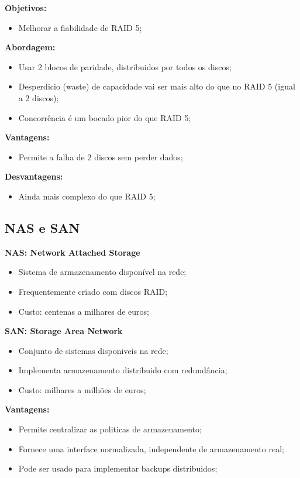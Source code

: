 \documentclass{article}
\begin{document}
\begin{flushleft}
  \textbf{Objetivos:}
  \begin{itemize}
    \item Melhorar a fiabilidade de RAID 5;
  \end{itemize}

  \textbf{Abordagem:}
  \begin{itemize}
    \item Usar 2 blocos de paridade, distribuidos por todos os discos;
    \item Desperdicio (waste) de capacidade vai ser mais alto do que no RAID 5 (igual a 2 discos);
    \item Concorrência é um bocado pior do que RAID 5;
  \end{itemize}

  \textbf{Vantagens:}
  \begin{itemize}
    \item Permite a falha de 2 discos sem perder dados;
  \end{itemize}

  \textbf{Desvantagens:}
  \begin{itemize}
    \item Ainda mais complexo do que RAID 5;
  \end{itemize}
\end{flushleft}

\subsection{NAS e SAN}

\begin{flushleft}
  \textbf{NAS: Network Attached Storage}
  \begin{itemize}
    \item Sistema de armazenamento disponível na rede;
    \item Frequentemente criado com discos RAID;
    \item Custo: centenas a milhares de euros;
  \end{itemize}

  \textbf{SAN: Storage Area Network}
  \begin{itemize}
    \item Conjunto de sistemas disponiveis na rede;
    \item Implementa armazenamento distribuido com redundância;
    \item Custo: milhares a milhões de euros;
  \end{itemize}

  \textbf{Vantagens:}
  \begin{itemize}
    \item Permite centralizar as politicas de armazenamento;
    \item Fornece uma interface normalizada, independente de armazenamento real;
    \item Pode ser usado para implementar backups distribuidos;
  \end{itemize}
\end{flushleft}
\end{document}
